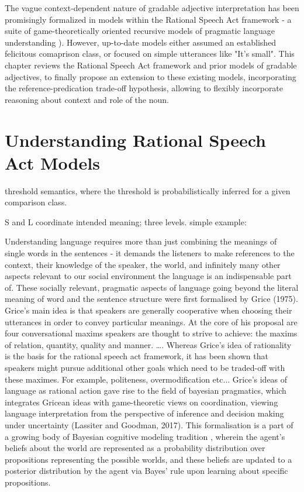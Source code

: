 The vague context-dependent nature of gradable adjective interpretation has been promisingly formalized in models within the Rational Speech Act framework -  a suite of game-theoretically oriented recursive models of pragmatic language understanding \parencite{goodman2016, lassiter2017adjectival, tessler2017warm}). However, up-to-date models either assumed an established felicitous comaprison class, or focused on simple utterances like "It's small". This chapter reviews the Rational Speech Act framework and prior models of gradable adjectives, to finally propose an extension to these existing models, incorporating the reference-predication trade-off hypothesis, allowing to flexibly incorporate reasoning about context and role of the noun. 
  
\section{Understanding Rational Speech Act Models}
threshold semantics, where the threshold is probabilistically inferred \parencite{lassiter2017adjectival} for a given comparison class.

S and L coordinate intended meaning; three levels. simple example: \parencite{goodman2016}

Understanding language requires more than just combining the meanings of single words in the sentences - it demands the listeners to make references to the context, their knowledge of the speaker, the world, and infinitely many other aspects relevant to our social environment the language is an indispensable part of. These socially relevant, pragmatic aspects of language going beyond the literal meaning of word and the sentence structure were first formalised by Grice (1975). Grice’s main idea is that speakers are generally cooperative when choosing their utterances in order to convey particular meanings. At the core of his proposal are four conversational maxims speakers are thought to strive to achieve: the maxims of relation, quantity, quality and manner. ….
Whereas Grice’s idea of rationality is the basis for the rational speech act framework, it has been shown that speakers might pursue additional other goals which need to be traded-off with these maximes. For example, politeness, overmodification etc...  
Grice’s ideas of language as rational action gave rise to the field of bayesian pragmatics, which integrates Gricean ideas with game-theoretic views on coordination, viewing language interpretation from the perspective of inference and decision making under uncertainty (Lassiter and Goodman, 2017).
This formalisation is a part of a growing body of Bayesian cognitive modeling tradition \parencite{tenenbaum2011grow}, wherein the agent’s beliefs about the world are represented as a probability distribution over propositions representing the possible worlds, and these beliefs are updated to a posterior distribution by the agent via Bayes’ rule upon learning about specific propositions. 

